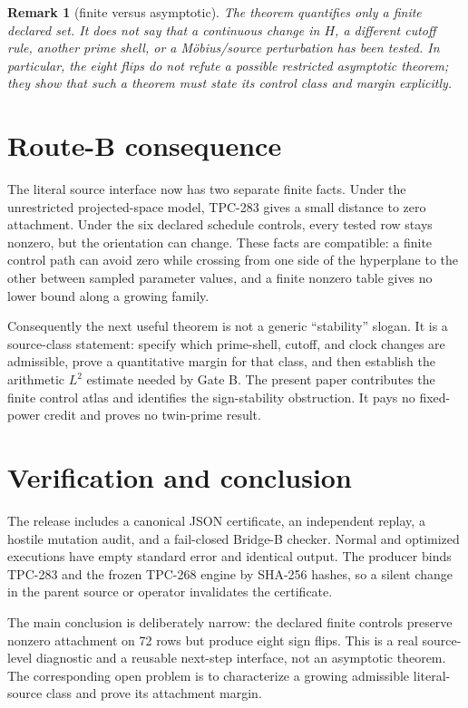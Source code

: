 \documentclass[11pt]{article}
\newtheorem{remark}[theorem]{Remark}
\begin{document}
\begin{remark}[finite versus asymptotic]
The theorem quantifies only a finite declared set.  It does not say that a
continuous change in $H$, a different cutoff rule, another prime shell, or a
Möbius/source perturbation has been tested.  In particular, the eight flips do
not refute a possible restricted asymptotic theorem; they show that such a
theorem must state its control class and margin explicitly.
\end{remark}

\section{Route-B consequence}

The literal source interface now has two separate finite facts.  Under the
unrestricted projected-space model, TPC-283 gives a small distance to zero
attachment.  Under the six declared schedule controls, every tested row stays
nonzero, but the orientation can change.  These facts are compatible: a finite
control path can avoid zero while crossing from one side of the hyperplane to
the other between sampled parameter values, and a finite nonzero table gives
no lower bound along a growing family.

Consequently the next useful theorem is not a generic ``stability'' slogan.
It is a source-class statement: specify which prime-shell, cutoff, and clock
changes are admissible, prove a quantitative margin for that class, and then
establish the arithmetic $L^2$ estimate needed by Gate B.  The present paper
contributes the finite control atlas and identifies the sign-stability
obstruction.  It pays no fixed-power credit and proves no twin-prime result.

\section{Verification and conclusion}

The release includes a canonical JSON certificate, an independent replay, a
hostile mutation audit, and a fail-closed Bridge-B checker.  Normal and
optimized executions have empty standard error and identical output.  The
producer binds TPC-283 and the frozen TPC-268 engine by SHA-256 hashes, so a
silent change in the parent source or operator invalidates the certificate.

The main conclusion is deliberately narrow: the declared finite controls
preserve nonzero attachment on 72 rows but produce eight sign flips.  This is
a real source-level diagnostic and a reusable next-step interface, not an
asymptotic theorem.  The corresponding open problem is to characterize a
growing admissible literal-source class and prove its attachment margin.



\end{document}

